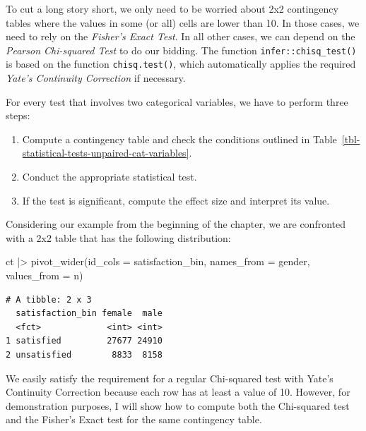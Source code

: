 \documentclass[
  letterpaper,
]{krantz}
\makeatletter
\newenvironment{Shaded}{\begin{snugshade}}{\end{snugshade}}
\newcommand{\AttributeTok}[1]{\textcolor[rgb]{0.40,0.45,0.13}{#1}}
\newcommand{\CommentTok}[1]{\textcolor[rgb]{0.37,0.37,0.37}{#1}}
\newcommand{\FunctionTok}[1]{\textcolor[rgb]{0.28,0.35,0.67}{#1}}
\newcommand{\NormalTok}[1]{\textcolor[rgb]{0.00,0.23,0.31}{#1}}
\newcommand{\SpecialCharTok}[1]{\textcolor[rgb]{0.37,0.37,0.37}{#1}}
\newenvironment{kframe}{%
\medskip{}
\setlength{\fboxsep}{.8em}
 \def\at@end@of@kframe{}%
 \ifinner\ifhmode%
  \def\at@end@of@kframe{\end{minipage}}%
  \begin{minipage}{\columnwidth}%
 \fi\fi%
 \def\FrameCommand##1{\hskip\@totalleftmargin \hskip-\fboxsep
 \colorbox{shadecolor}{##1}\hskip-\fboxsep
     \hskip-\linewidth \hskip-\@totalleftmargin \hskip\columnwidth}%
 \MakeFramed {\advance\hsize-\width
   \@totalleftmargin\z@ \linewidth\hsize
   \@setminipage}}%
 {\par\unskip\endMakeFramed%
 \at@end@of@kframe}
\renewenvironment{Shaded}{\begin{kframe}}{\end{kframe}}
\makeatother
\begin{document}
To cut a long story short, we only need to be worried about 2x2
contingency tables where the values in some (or all) cells are lower
than 10. In those cases, we need to rely on the \emph{Fisher's Exact
Test}. In all other cases, we can depend on the \emph{Pearson
Chi-squared Test} to do our bidding. The function
\texttt{infer::chisq\_test()} is based on the function
\texttt{chisq.test()}, which automatically applies the required
\emph{Yate's Continuity Correction} if necessary.

For every test that involves two categorical variables, we have to
perform three steps:

\begin{enumerate}
\def\labelenumi{\arabic{enumi}.}
\item
  Compute a contingency table and check the conditions outlined in
  Table~\ref{tbl-statistical-tests-unpaired-cat-variables}.
\item
  Conduct the appropriate statistical test.
\item
  If the test is significant, compute the effect size and interpret its
  value.
\end{enumerate}

Considering our example from the beginning of the chapter, we are
confronted with a 2x2 table that has the following distribution:

\begin{Shaded}
\begin{Highlighting}[]
\NormalTok{ct }\SpecialCharTok{|\textgreater{}} \FunctionTok{pivot\_wider}\NormalTok{(}\AttributeTok{id\_cols =}\NormalTok{ satisfaction\_bin,}
                   \AttributeTok{names\_from =}\NormalTok{ gender,}
                   \AttributeTok{values\_from =}\NormalTok{ n)}
\end{Highlighting}
\end{Shaded}

\begin{verbatim}
# A tibble: 2 x 3
  satisfaction_bin female  male
  <fct>             <int> <int>
1 satisfied         27677 24910
2 unsatisfied        8833  8158
\end{verbatim}

We easily satisfy the requirement for a regular Chi-squared test with
Yate's Continuity Correction because each row has at least a value of
10. However, for demonstration purposes, I will show how to compute both
the Chi-squared test and the Fisher's Exact test for the same
contingency table.

\begin{Shaded}
\end{Shaded}
\end{document}
